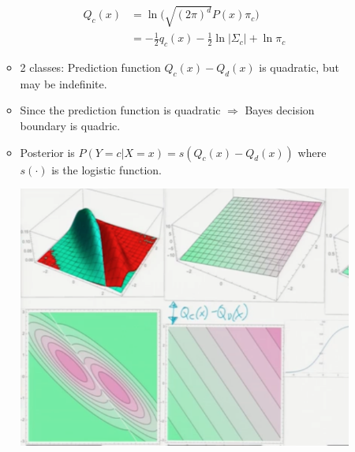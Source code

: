 \documentclass[10pt]{article}
\begin{document}
\begin{description}
\begin{itemize}
\begin{itemize}
							\begin{align*}
								Q_{c}(x) &= \ln \Big(\sqrt{(2\pi)^{d}}P(x)\pi_{c}\Big)\\
										&= -\frac{1}{2}q_{c}(x)-\frac{1}{2} \ln |\Sigma_{c}| + \ln \pi_{c}
							\end{align*}
						\item 2 classes: Prediction function $Q_{c}(x) - Q_{d}(x)$ is quadratic, but may be indefinite.
						\item Since the prediction function is quadratic $\Rightarrow$ Bayes decision boundary is quadric.
						\item Posterior is $P(Y=c|X=x) = s(Q_{c}(x) - Q_{d}(x))$ where $s(\cdot)$ is the logistic function.
							\begin{center}
								\includegraphics[scale=0.5]{images/LDA}
							\end{center} 
					\end{itemize}
				

\end{itemize}
\end{description}
\end{document}
